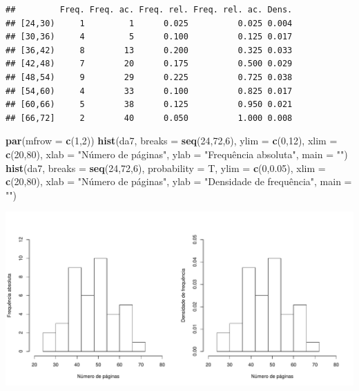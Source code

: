 \documentclass[]{article}
\newenvironment{Shaded}{\begin{snugshade}}{\end{snugshade}}
\newcommand{\KeywordTok}[1]{\textcolor[rgb]{0.13,0.29,0.53}{\textbf{#1}}}
\newcommand{\DataTypeTok}[1]{\textcolor[rgb]{0.13,0.29,0.53}{#1}}
\newcommand{\DecValTok}[1]{\textcolor[rgb]{0.00,0.00,0.81}{#1}}
\newcommand{\FloatTok}[1]{\textcolor[rgb]{0.00,0.00,0.81}{#1}}
\newcommand{\StringTok}[1]{\textcolor[rgb]{0.31,0.60,0.02}{#1}}
\newcommand{\NormalTok}[1]{#1}
\begin{document}
\begin{verbatim}
##         Freq. Freq. ac. Freq. rel. Freq. rel. ac. Dens.
## [24,30)     1         1      0.025          0.025 0.004
## [30,36)     4         5      0.100          0.125 0.017
## [36,42)     8        13      0.200          0.325 0.033
## [42,48)     7        20      0.175          0.500 0.029
## [48,54)     9        29      0.225          0.725 0.038
## [54,60)     4        33      0.100          0.825 0.017
## [60,66)     5        38      0.125          0.950 0.021
## [66,72]     2        40      0.050          1.000 0.008
\end{verbatim}

\begin{Shaded}
\begin{Highlighting}[]
\KeywordTok{par}\NormalTok{(}\DataTypeTok{mfrow =} \KeywordTok{c}\NormalTok{(}\DecValTok{1}\NormalTok{,}\DecValTok{2}\NormalTok{))}
\KeywordTok{hist}\NormalTok{(da7, }\DataTypeTok{breaks =} \KeywordTok{seq}\NormalTok{(}\DecValTok{24}\NormalTok{,}\DecValTok{72}\NormalTok{,}\DecValTok{6}\NormalTok{), }
     \DataTypeTok{ylim =} \KeywordTok{c}\NormalTok{(}\DecValTok{0}\NormalTok{,}\DecValTok{12}\NormalTok{), }\DataTypeTok{xlim =} \KeywordTok{c}\NormalTok{(}\DecValTok{20}\NormalTok{,}\DecValTok{80}\NormalTok{), }
     \DataTypeTok{xlab =} \StringTok{"Número de páginas"}\NormalTok{, }
     \DataTypeTok{ylab =} \StringTok{"Frequência absoluta"}\NormalTok{, }
     \DataTypeTok{main =} \StringTok{""}\NormalTok{)}
\KeywordTok{hist}\NormalTok{(da7, }\DataTypeTok{breaks =} \KeywordTok{seq}\NormalTok{(}\DecValTok{24}\NormalTok{,}\DecValTok{72}\NormalTok{,}\DecValTok{6}\NormalTok{), }\DataTypeTok{probability =}\NormalTok{ T, }
     \DataTypeTok{ylim =} \KeywordTok{c}\NormalTok{(}\DecValTok{0}\NormalTok{,}\FloatTok{0.05}\NormalTok{), }\DataTypeTok{xlim =} \KeywordTok{c}\NormalTok{(}\DecValTok{20}\NormalTok{,}\DecValTok{80}\NormalTok{), }
     \DataTypeTok{xlab =} \StringTok{"Número de páginas"}\NormalTok{, }
     \DataTypeTok{ylab =} \StringTok{"Densidade de frequência", }
\StringTok{     main = "")}
\end{Highlighting}
\end{Shaded}

\includegraphics{Lista_1_Gabarito_files/figure-latex/unnamed-chunk-13-1.pdf}
\end{document}
